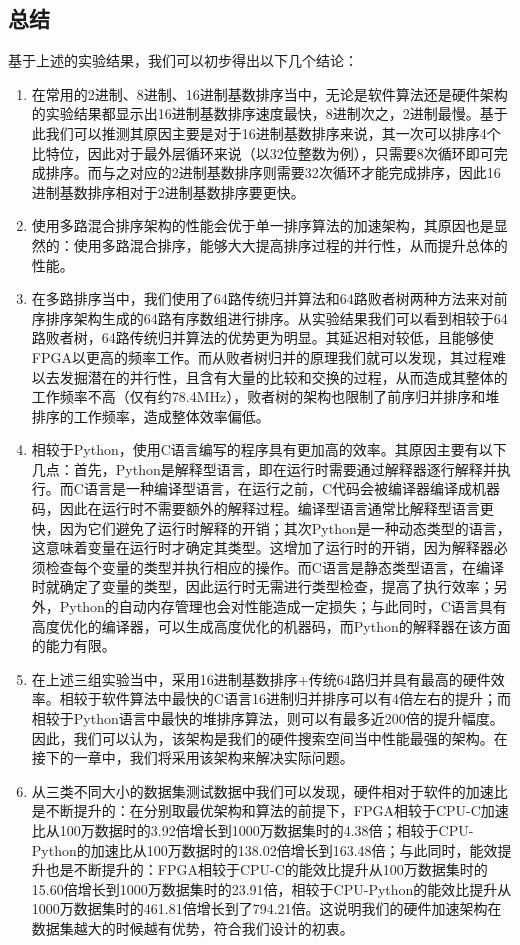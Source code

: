 \subsection{总结}
基于上述的实验结果，我们可以初步得出以下几个结论：
\begin{enumerate}
    \item 在常用的2进制、8进制、16进制基数排序当中，无论是软件算法还是硬件架构的实验结果都显示出16进制基数排序速度最快，8进制次之，2进制最慢。基于此我们可以推测其原因主要是对于16进制基数排序来说，其一次可以排序4个比特位，因此对于最外层循环来说（以32位整数为例），只需要8次循环即可完成排序。而与之对应的2进制基数排序则需要32次循环才能完成排序，因此16进制基数排序相对于2进制基数排序要更快。
    \item 使用多路混合排序架构的性能会优于单一排序算法的加速架构，其原因也是显然的：使用多路混合排序，能够大大提高排序过程的并行性，从而提升总体的性能。
    \item 在多路排序当中，我们使用了64路传统归并算法和64路败者树两种方法来对前序排序架构生成的64路有序数组进行排序。从实验结果我们可以看到相较于64路败者树，64路传统归并算法的优势更为明显。其延迟相对较低，且能够使FPGA以更高的频率工作。而从败者树归并的原理我们就可以发现，其过程难以去发掘潜在的并行性，且含有大量的比较和交换的过程，从而造成其整体的工作频率不高（仅有约78.4MHz），败者树的架构也限制了前序归并排序和堆排序的工作频率，造成整体效率偏低。
    \item 相较于Python，使用C语言编写的程序具有更加高的效率。其原因主要有以下几点：首先，Python是解释型语言，即在运行时需要通过解释器逐行解释并执行。而C语言是一种编译型语言，在运行之前，C代码会被编译器编译成机器码，因此在运行时不需要额外的解释过程。编译型语言通常比解释型语言更快，因为它们避免了运行时解释的开销；其次Python是一种动态类型的语言，这意味着变量在运行时才确定其类型。这增加了运行时的开销，因为解释器必须检查每个变量的类型并执行相应的操作。而C语言是静态类型语言，在编译时就确定了变量的类型，因此运行时无需进行类型检查，提高了执行效率；另外，Python的自动内存管理也会对性能造成一定损失；与此同时，C语言具有高度优化的编译器，可以生成高度优化的机器码，而Python的解释器在该方面的能力有限。
    \item 在上述三组实验当中，采用16进制基数排序+传统64路归并具有最高的硬件效率。相较于软件算法中最快的C语言16进制归并排序可以有4倍左右的提升；而相较于Python语言中最快的堆排序算法，则可以有最多近200倍的提升幅度。因此，我们可以认为，该架构是我们的硬件搜索空间当中性能最强的架构。在接下的一章中，我们将采用该架构来解决实际问题。
    \item 从三类不同大小的数据集测试数据中我们可以发现，硬件相对于软件的加速比是不断提升的：在分别取最优架构和算法的前提下，FPGA相较于CPU-C加速比从100万数据时的3.92倍增长到1000万数据集时的4.38倍；相较于CPU-Python的加速比从100万数据时的138.02倍增长到163.48倍；与此同时，能效提升也是不断提升的：FPGA相较于CPU-C的能效比提升从100万数据集时的15.60倍增长到1000万数据集时的23.91倍，相较于CPU-Python的能效比提升从1000万数据集时的461.81倍增长到了794.21倍。这说明我们的硬件加速架构在数据集越大的时候越有优势，符合我们设计的初衷。
\end{enumerate}


